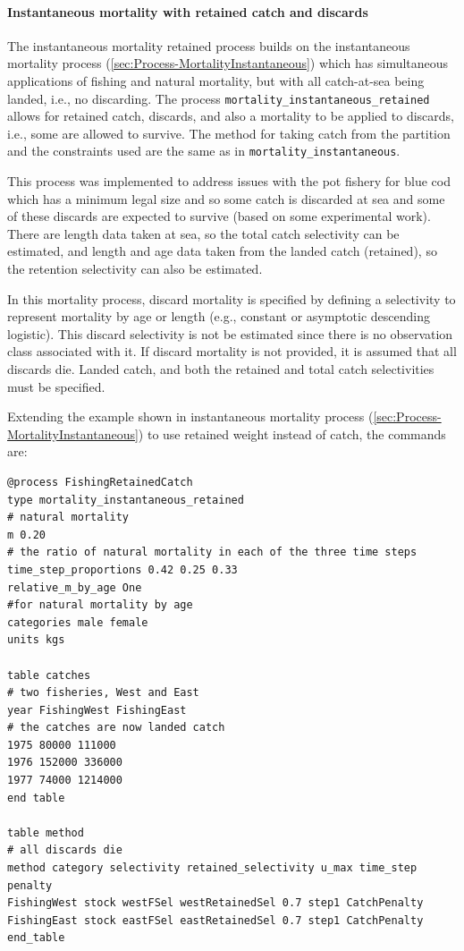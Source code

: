 \paragraph{Instantaneous mortality with retained catch and discards}\label{sec:Process-MortalityInstantaneousRetained}

The instantaneous mortality retained process builds on the instantaneous mortality process (\ref{sec:Process-MortalityInstantaneous}) which has simultaneous applications of fishing and natural mortality, but with all catch-at-sea being landed, i.e., no discarding. The process \texttt{mortality\_instantaneous\_retained} allows for retained catch, discards, and also a mortality to be applied to discards, i.e., some are allowed to survive. The method for taking catch from the partition and the constraints used are the same as in \texttt{mortality\_instantaneous}.

This process was implemented to address issues with the pot fishery for blue cod which has a minimum legal size and so some catch is discarded at sea and some of these discards are expected to survive (based on some experimental work). There are length data taken at sea, so the total catch selectivity can be estimated, and length and age data taken from the landed catch (retained), so the retention selectivity can also be estimated.

In this mortality process, discard mortality is specified by defining a selectivity to represent mortality by age or length (e.g., constant or asymptotic descending logistic).  This discard selectivity is not be estimated since there is no observation class associated with it. If discard mortality is not provided, it is assumed that all discards die. Landed catch, and both the retained and total catch selectivities must be specified.

Extending the example shown in instantaneous mortality process (\ref{sec:Process-MortalityInstantaneous}) to use retained weight instead of catch, the commands are:

{\small{\begin{verbatim}
@process FishingRetainedCatch
type mortality_instantaneous_retained
# natural mortality
m 0.20
# the ratio of natural mortality in each of the three time steps
time_step_proportions 0.42 0.25 0.33
relative_m_by_age One
#for natural mortality by age
categories male female
units kgs

table catches
# two fisheries, West and East
year FishingWest FishingEast
# the catches are now landed catch
1975 80000 111000
1976 152000 336000
1977 74000 1214000
end table

table method
# all discards die
method category selectivity retained_selectivity u_max time_step penalty
FishingWest stock westFSel westRetainedSel 0.7 step1 CatchPenalty
FishingEast stock eastFSel eastRetainedSel 0.7 step1 CatchPenalty
end_table
\end{verbatim}}}

